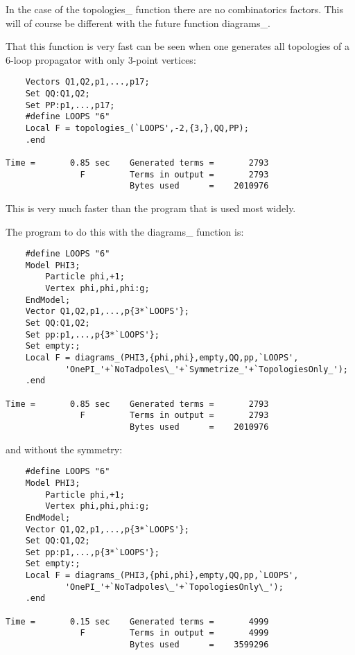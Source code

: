 In the case of the topologies\_ function there are no combinatorics 
factors. This will of course be different with the future function 
diagrams\_.

That this function is very fast can be seen when one generates all 
topologies of a 6-loop propagator with only 3-point vertices:
\begin{verbatim}
    Vectors Q1,Q2,p1,...,p17;
    Set QQ:Q1,Q2;
    Set PP:p1,...,p17;
    #define LOOPS "6"
    Local F = topologies_(`LOOPS',-2,{3,},QQ,PP);
    .end

Time =       0.85 sec    Generated terms =       2793
               F         Terms in output =       2793
                         Bytes used      =    2010976
\end{verbatim}
This is very much faster than the program that is used most widely.

The program to do this with the diagrams\_ function is:
\begin{verbatim}
    #define LOOPS "6"
    Model PHI3;
        Particle phi,+1;
        Vertex phi,phi,phi:g;
    EndModel;
    Vector Q1,Q2,p1,...,p{3*`LOOPS'};
    Set QQ:Q1,Q2;
    Set pp:p1,...,p{3*`LOOPS'};
    Set empty:;
    Local F = diagrams_(PHI3,{phi,phi},empty,QQ,pp,`LOOPS',
            'OnePI_'+`NoTadpoles\_'+`Symmetrize_'+`TopologiesOnly_');
    .end

Time =       0.85 sec    Generated terms =       2793
               F         Terms in output =       2793
                         Bytes used      =    2010976
\end{verbatim}
and without the symmetry:
\begin{verbatim}
    #define LOOPS "6"
    Model PHI3;
        Particle phi,+1;
        Vertex phi,phi,phi:g;
    EndModel;
    Vector Q1,Q2,p1,...,p{3*`LOOPS'};
    Set QQ:Q1,Q2;
    Set pp:p1,...,p{3*`LOOPS'};
    Set empty:;
    Local F = diagrams_(PHI3,{phi,phi},empty,QQ,pp,`LOOPS',
            'OnePI_'+`NoTadpoles\_'+`TopologiesOnly\_');
    .end

Time =       0.15 sec    Generated terms =       4999
               F         Terms in output =       4999
                         Bytes used      =    3599296
\end{verbatim}
